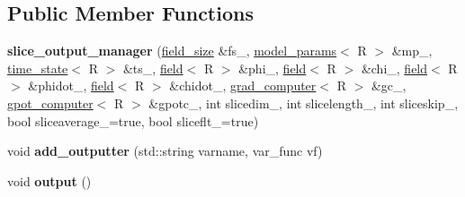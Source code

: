 \subsection*{Public Member Functions}
\begin{DoxyCompactItemize}
\item 
\hypertarget{classslice__output__manager_abe4f0eeea3e5288c6c168de759dd6096}{
{\bfseries slice\_\-output\_\-manager} (\hyperlink{structfield__size}{field\_\-size} \&fs\_\-, \hyperlink{structmodel__params}{model\_\-params}$<$ R $>$ \&mp\_\-, \hyperlink{structtime__state}{time\_\-state}$<$ R $>$ \&ts\_\-, \hyperlink{classfield}{field}$<$ R $>$ \&phi\_\-, \hyperlink{classfield}{field}$<$ R $>$ \&chi\_\-, \hyperlink{classfield}{field}$<$ R $>$ \&phidot\_\-, \hyperlink{classfield}{field}$<$ R $>$ \&chidot\_\-, \hyperlink{classgrad__computer}{grad\_\-computer}$<$ R $>$ \&gc\_\-, \hyperlink{classgpot__computer}{gpot\_\-computer}$<$ R $>$ \&gpotc\_\-, int slicedim\_, int slicelength\_, int sliceskip\_, bool sliceaverage\_\-=true, bool sliceflt\_\-=true)}
\label{classslice__output__manager_abe4f0eeea3e5288c6c168de759dd6096}

\item 
\hypertarget{classslice__output__manager_a0864d241251993f377fe46cb63b1cc3b}{
void {\bfseries add\_\-outputter} (std::string varname, var\_\-func vf)}
\label{classslice__output__manager_a0864d241251993f377fe46cb63b1cc3b}

\item 
\hypertarget{classslice__output__manager_a5ee2088a87d16e709caf41860063d4ab}{
void {\bfseries output} ()}
\label{classslice__output__manager_a5ee2088a87d16e709caf41860063d4ab}

\end{DoxyCompactItemize}
